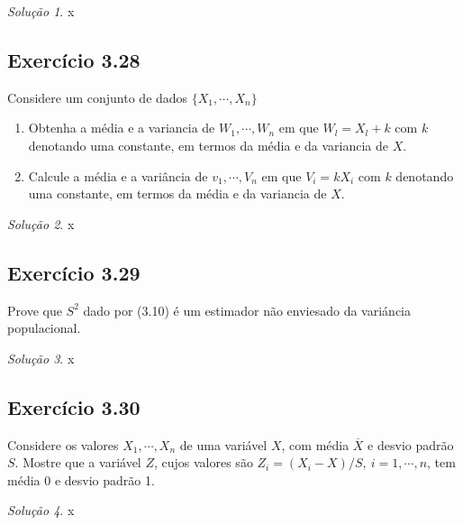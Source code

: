 \documentclass[
]{latex/krantz}
\providecommand{\tightlist}{%
  \setlength{\itemsep}{0pt}\setlength{\parskip}{0pt}}
\theoremstyle{definition}
\theoremstyle{definition}
\theoremstyle{definition}
\theoremstyle{definition}
\theoremstyle{remark}
\newtheorem*{solution}{Solução}
\begin{document}
\begin{solution}
x
\end{solution}

\hypertarget{exr3-28}{%
\subsection*{Exercício 3.28}\label{exr3-28}}

Considere um conjunto de dados \(\{X_{1}, \cdots , X_{n}\}\)

\begin{enumerate}
\def\labelenumi{\alph{enumi})}
\tightlist
\item
  Obtenha a média e a variancia de \(W_{1}, \cdots , W_{n}\) em que \(W_{l} = X_{l} + k\) com \(k\) denotando uma constante, em termos da média e da variancia de \(X\).
\item
  Calcule a média e a variância de \(v_{1}, \cdots , V_{n}\) em que \(V_{i} = kX_{i}\) com \(k\) denotando uma constante, em termos da média e da variancia de \(X\).
\end{enumerate}

\begin{solution}
x
\end{solution}

\hypertarget{exr3-29}{%
\subsection*{Exercício 3.29}\label{exr3-29}}

Prove que \(S^{2}\) dado por (3.10) é um estimador não enviesado da variáncia populacional.

\begin{solution}
x
\end{solution}

\hypertarget{exr3-30}{%
\subsection*{Exercício 3.30}\label{exr3-30}}

Considere os valores \(X_{1}, \cdots , X_{n}\) de uma variável \(X\), com média \(\overline{X}\) e desvio padrão \(S\). Mostre que a variável \(Z\), cujos valores são \(Z_{i} = (X_{i} - X) / S, \ i = 1, \cdots , n\), tem média 0 e desvio padrão 1.

\begin{solution}
x
\end{solution}
\end{document}
